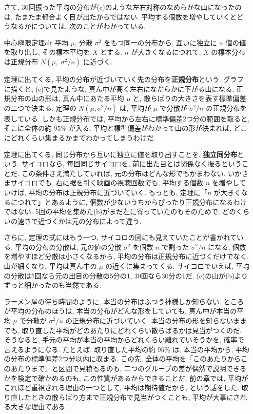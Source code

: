     さて, 30回振った平均の分布が(c)のような左右対称のなめらかな山になったのは, たまたま都合よく目が出たからではない.
    平均する個数を増やしていくとどうなるかについては, 次のことがわかっている.

    \begin{thm}{中心極限定理}{clt}
      平均 $\mu$, 分散 $\sigma^2$ をもつ同一の分布から, 互いに独立に $n$ 個の値を取り出し, その標本平均を $\bar{X}$ とする.
      $n$ が大きくなるにつれて, $\bar{X}$ の標本分布は正規分布 $N\!\left(\mu,\; \sigma^2 / n\right)$ に近づく.
    \end{thm}

    定理に出てくる, 平均の分布が近づいていく先の分布を\textbf{正規分布}という.
    グラフに描くと, (c)で見たような, 真ん中が高く左右になだらかに下がる山になる.
    正規分布の山の形は, 真ん中にあたる平均 $\mu$ と, 散らばりの大きさを表す標準偏差の二つで決まる.
    定理の $N(\mu, \sigma^2/n)$ は, 平均が $\mu$ で分散が $\sigma^2/n$ の正規分布を表している.
    しかも正規分布では, 平均から左右に標準偏差2つ分の範囲を取ると, そこに全体の約 $95\%$ が入る.
    平均と標準偏差がわかって山の形が決まれば, どこにどれくらい集まるかまでわかってしまうわけだ.

    定理に出てくる, 同じ分布から互いに独立に値を取り出すことを, \textbf{独立同分布}という.
    サイコロなら, 毎回同じサイコロを, 前に出た目とは関係なく振るということだ.
    この条件さえ満たしていれば, 元の分布はどんな形でもかまわない.
    いかさまサイコロでも, 右に裾を引く映画の視聴回数でも, 平均する個数 $n$ を増やしていけば, 平均の分布は正規分布に近づいていく.
    もっとも, 定理に「$n$ が大きくなるにつれて」とあるように, 個数が少ないうちからぴったり正規分布になるわけではない.
    5回の平均を集めた(b)がまだ左に寄っていたのもそのためで, どのくらいの速さで近づくかは元の分布によって違う.

    さらに, 定理の式にはもう一つ, サイコロの図にも見えていたことが書かれている.
    平均の分布の分散は, 元の値の分散 $\sigma^2$ を個数 $n$ で割った $\sigma^2/n$ になる.
    個数を増やすほど分散は小さくなるから, 平均の分布は正規分布に近づくだけでなく, 山が細くなり, 平均は真ん中の $\mu$ の近くに集まってくる.
    サイコロでいえば, 平均の分散は5回なら元の出目の分散の5分の1, 30回なら30分の1だ.
    (c)の山が(b)よりずっと細かったのも当然である.

    ラーメン屋の待ち時間のように, 本当の分布はふつう神様しか知らない.
    ところが平均の分布のほうは, 本当の分布がどんな形をしていても, 真ん中が本当の平均 $\mu$ で分散が $\sigma^2/n$ の正規分布に近づいていく.
    本当の分布の形を知らないままでも, 取り直した平均がどのあたりにどれくらい散らばるかは見当がつくのだ.
    そうなると, 手元の平均が本当の平均からどれくらい離れていそうかを, 確率で言えるようになる.
    たとえば, 取り直した平均の約 $95\%$ は, 本当の平均から, 平均の分布の標準偏差2つ分以内に収まる.
    この先, 全体の平均を「このあたりからこのあたりまで」と区間で見積もるのも, 二つのグループの差が偶然で説明できるかを検定で確かめるのも, この性質があるからできることだ.
    前の章では, 平均がこれほど重視される理由の一つとして, 平均は期待値だから, という話をした.
    取り直したときの散らばり方まで正規分布で見当がつくことも, 平均が大事にされる大きな理由である.

